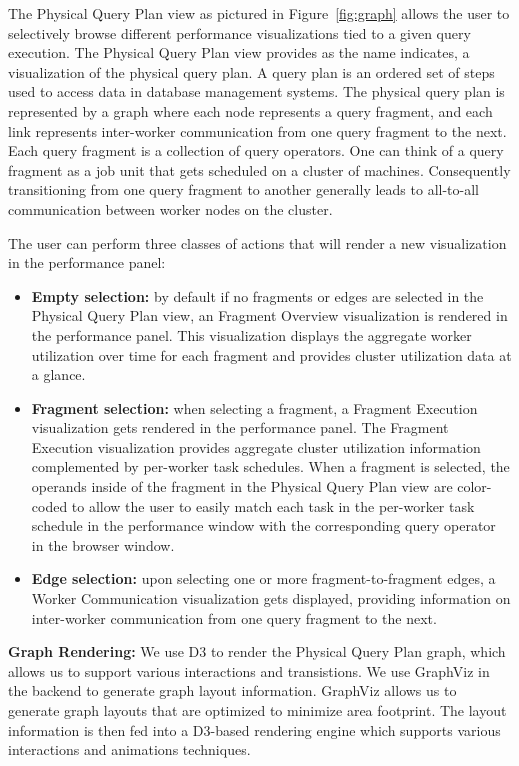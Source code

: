 \documentclass{chi2009}
\newcommand*{\graph}{Physical Query Plan\xspace}
\newcommand*{\fragment}{Fragment Execution\xspace}
\newcommand*{\network}{Worker Communication\xspace}
\newcommand*{\overall}{Fragment Overview\xspace}
\begin{document}
The \graph view as pictured in Figure~\ref{fig:graph} allows the user to selectively browse different performance visualizations tied to a given query execution. The \graph view provides as the name indicates, a visualization of the physical query plan. A query plan is an ordered set of steps used to access data in database management systems. The physical query plan is represented by a graph where each node represents a query fragment, and each link represents inter-worker communication from one query fragment to the next. Each query fragment is a collection of query operators. One can think of a query fragment as a job unit that gets scheduled on a cluster of machines. Consequently transitioning from one query fragment to another generally leads to all-to-all communication between worker nodes on the cluster.


The user can perform three classes of actions that will render a new visualization in the performance panel:
\begin{itemize}

    \item \textbf{Empty selection:} by default if no fragments or edges are selected in the \graph view, an \overall visualization is rendered in the performance panel. This visualization displays the aggregate worker utilization over time for each fragment and provides cluster utilization data at a glance.
    \item \textbf{Fragment selection:} when selecting a fragment, a \fragment visualization gets rendered in the performance panel. The \fragment visualization provides aggregate cluster utilization information complemented by per-worker task schedules. When a fragment is selected, the operands inside of the fragment in the \graph view are color-coded to allow the user to easily match each task in the per-worker task schedule in the performance window with the corresponding query operator in the browser window.
    \item \textbf{Edge selection:} upon selecting one or more fragment-to-fragment edges, a \network visualization gets displayed, providing information on inter-worker communication from one query fragment to the next.

\end{itemize}

\textbf{Graph Rendering:} We use D3 \cite{d3} to render the \graph graph, which allows us to support various interactions and transistions. We use GraphViz \cite{Ellson01graphviz} in the backend to generate graph layout information. GraphViz allows us to generate graph layouts that are optimized to minimize area footprint. The layout information is then fed into a D3-based rendering engine which supports various interactions and animations techniques.
\end{document}
